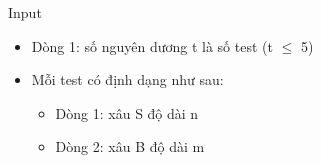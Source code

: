Input
\begin{itemize}
	\item     Dòng 1: số nguyên dương t là số test (t  $\le$  5)   
	\item     Mỗi test có định dạng như sau:    
\begin{itemize}
	\item       Dòng 1: xâu S độ dài n     
	\item       Dòng 2: xâu B độ dài m     
\end{itemize}
\end{itemize}